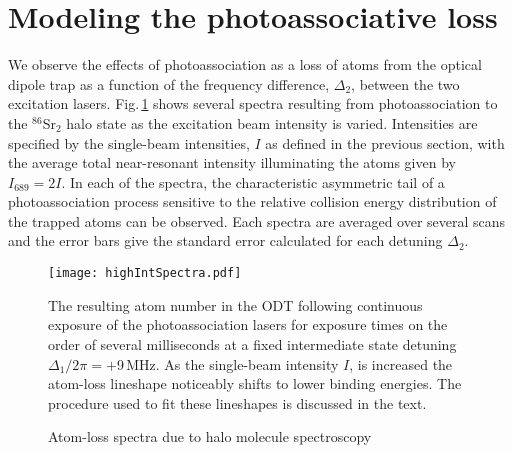 



\section{Modeling the photoassociative loss} \label{sec:highE_paLoss}
We observe the effects of photoassociation as a loss of atoms from the optical dipole trap as a function of the frequency difference, $\Delta_2$, between the two excitation lasers.
Fig.\,\ref{fig:highIntSpectra} shows several spectra resulting from photoassociation to the $^{86}$Sr$_2$ halo state as the excitation beam intensity is varied.
Intensities are specified by the single-beam intensities, $I$ as defined in the previous section, with the average total near-resonant intensity illuminating the atoms given by $I_{\text{689}}=2I$.
In each of the spectra, the characteristic asymmetric tail of a photoassociation process sensitive to the relative collision energy distribution of the trapped atoms can be observed.
Each spectra are averaged over several scans and the error bars give the standard error calculated for each detuning $\Delta_2$.
	\begin{figure}
		\centerline{
		\texttt{[image: highIntSpectra.pdf]}}
		\caption{Atom-loss spectra due to halo molecule spectroscopy}{The resulting atom number in the ODT following continuous exposure of the photoassociation lasers for exposure times on the order of several milliseconds at a fixed intermediate state detuning $\Delta_1/2\pi=+$9\,MHz. As the single-beam intensity $I$, is increased the atom-loss  lineshape noticeably shifts to lower binding energies. The procedure used to fit these lineshapes is discussed in the text.}
		\label{fig:highIntSpectra}
	\end{figure}
	
